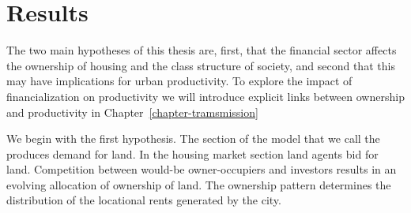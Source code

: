 \chapter{Results} \label{chapter-results}

The two main hypotheses of this thesis are, first, that the financial sector affects the ownership of housing and the class structure of society, and second that this may have implications for urban productivity. To explore the impact of financialization on productivity we will introduce explicit links between ownership and productivity in Chapter~\ref{chapter-tramsmission}

We begin with the first hypothesis. The section of the model that we call the produces demand for land. In the housing market section land agents bid for land. Competition between would-be owner-occupiers and investors results in an evolving allocation of ownership of land. The ownership pattern determines the distribution of the locational rents generated by the city.


